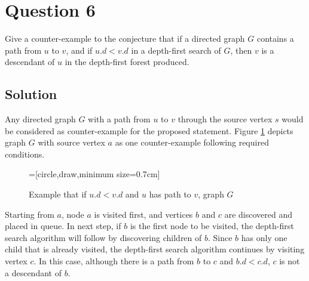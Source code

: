 
\section*{Question 6}

Give a counter-example to the conjecture that if a directed graph $G$ contains a path from $u$ to $v$, and if $u.d < v.d$ in a depth-first search of $G$, then $v$ is a descendant of $u$ in the depth-first forest produced.

\subsection*{Solution}

Any directed graph $G$ with a path from $u$ to $v$ through the source vertex $s$ would be considered as counter-example for the proposed statement. Figure \ref{fig61} depicts graph $G$ with source vertex $a$ as one counter-example following required conditions.

\begin{figure}[H]\centering
{}=[circle,draw,minimum size=0.7cm]
\caption{Example that if $u.d < v.d$ and $u$ has path to $v$,  graph $G$}\label{fig61}
\end{figure}

Starting from $a$, node $a$ is visited first, and vertices $b$ and $c$ are discovered and placed in queue. In next step, if $b$ is the first node to be visited, the depth-first search algorithm will follow by discovering children of $b$. Since $b$ has only one child that is already visited, the depth-first search algorithm continues by visiting vertex $c$. In this case, although there is a path from $b$ to $c$ and $b.d < c.d$, $c$ is not a descendant of $b$.
